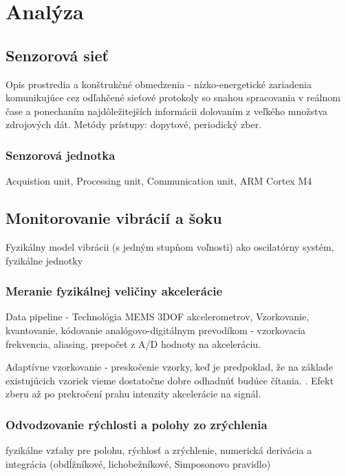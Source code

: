 \chapter{Analýza}

\section{Senzorová sieť}
Opis prostredia a konštrukčné obmedzenia - nízko-energetické zariadenia komunikujúce cez odľahčené sieťové
protokoly so snahou spracovania v reálnom čase a ponechaním najdôležitejších informácii dolovaním z veľkého množstva zdrojových dát. Metódy prístupy: dopytové, periodický zber.
\cite{wsn-overview}

\subsection{Senzorová jednotka}
Acquistion unit, Processing unit, Communication unit, ARM Cortex M4
\cite{big-data-collection-wsn}

\section{Monitorovanie vibrácií a šoku}
Fyzikálny model vibrácii (s jedným stupňom voľnosti) ako oscilatórny systém, fyzikálne jednotky
\cite{vibrations-shock}
 
\subsection{Meranie fyzikálnej veličiny akcelerácie}
Data pipeline - Technológia MEMS 3DOF akcelerometrov, Vzorkovanie, kvantovanie, kódovanie analógovo-digitálnym prevodíkom - vzorkovacia frekvencia, aliasing, prepočet z A/D hodnoty na akceleráciu. \cite{mdof-mems-accelerometers} 

Adaptívne vzorkovanie - preskočenie vzorky, keď je predpoklad, že na základe existujúcich vzoriek vieme dostatočne dobre odhadnúť budúce čítania. \cite{adaptive-sampling}. Efekt zberu až po prekročení prahu intenzity akcelerácie na signál.

\subsection{Odvodzovanie rýchlosti a polohy zo zrýchlenia}
fyzikálne vzťahy pre polohu, rýchlosť a zrýchlenie, numerická derivácia a integrácia (obdĺžníkové, lichobežníkové, Simposonovo pravidlo) \cite{integration-acceleration-envelopes}

